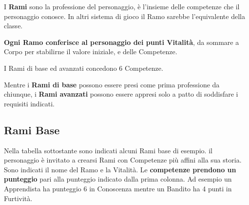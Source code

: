 \documentclass[12pt,a4paper,twoside,openany]{book}
\begin{document}
\begin{multicols}{2}

I \textbf{Rami} sono la professione del personaggio, è l'insieme delle competenze che il personaggio conosce. In altri sistema di gioco il Ramo sarebbe l'equivalente della classe.

\textbf{Ogni Ramo conferisce al personaggio dei punti Vitalità}, da sommare a Corpo per stabilirne il valore iniziale, e delle Competenze.

I Rami di base ed avanzati concedono 6 Competenze.

Mentre i \textbf{Rami di base} possono essere presi come prima professione da chiunque, i\textbf{ Rami avanzati} possono essere appresi solo a patto di soddisfare i requisiti indicati.

\subsection{Rami Base}

Nella tabella sottostante sono indicati alcuni Rami base di esempio. il personaggio è invitato a crearsi Rami con Competenze più affini alla sua storia.
Sono indicati il nome del Ramo e la Vitalità. Le \textbf{competenze prendono un punteggio} pari alla punteggio indicato dalla prima colonna. Ad esempio un Apprendista ha punteggio 6 in Conoscenza mentre un Bandito ha 4 punti in Furtività.

\end{multicols}
\end{document}
